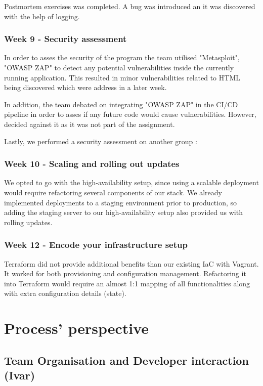 \documentclass{article}
\begin{document}
{Postmortem exercises was completed. A bug was introduced an it was discovered with the help of logging.

\subsubsection{Week 9 - Security  assessment}
In order to asses the security of the program the team utilised "Metasploit", "OWASP ZAP" to detect any potential vulnerabilities inside the currently running application. This resulted in minor vulnerabilities related to HTML being discovered which were address in a later week.

In addition, the team debated on integrating "OWASP ZAP" in the CI/CD pipeline in order to asses if any future code would cause vulnerabilities. However, decided against it as it was not part of the assignment.

Lastly, we performed a security assessment on another group : 

\subsubsection{Week 10 - Scaling and rolling out updates }
We opted to go with the high-availability setup, since using a scalable deployment would require refactoring several components of our stack.
We already implemented deployments to a staging environment prior to production, so adding the staging server to our high-availability setup also provided us with rolling updates.  

\subsubsection{Week 12 - Encode your infrastructure setup }

Terraform did not provide additional benefits than our existing IaC with Vagrant. It worked for both provisioning and configuration management. Refactoring it into Terraform would require an almost 1:1 mapping of all functionalities along with extra configuration details (state).

\section{Process' perspective} \label{cicd}

\subsection{Team Organisation and Developer interaction (Ivar)} 

}
\end{document}
